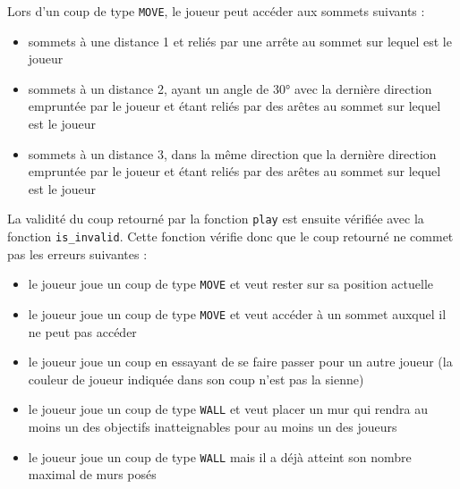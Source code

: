 Lors d'un coup de type \texttt{MOVE}, le joueur peut accéder aux sommets suivants :
\begin{itemize}
\item sommets à une distance 1 et reliés par une arrête au sommet sur lequel est le joueur
\item sommets à un distance 2, ayant un angle de 30° avec la dernière direction empruntée par le joueur et étant reliés par des arêtes au sommet sur lequel est le joueur
  \item sommets à un distance 3, dans la même direction que la dernière direction empruntée par le joueur et étant reliés par des arêtes au sommet sur lequel est le joueur
\end{itemize}

\bigskip

La validité du coup retourné par la fonction \texttt{play} est ensuite vérifiée avec la fonction \texttt{is\_invalid}.
Cette fonction vérifie donc que le coup retourné ne commet pas les erreurs suivantes :
\begin{itemize}
\item le joueur joue un coup de type \texttt{MOVE} et veut rester sur sa position actuelle
  \item le joueur joue un coup de type \texttt{MOVE} et veut accéder à un sommet auxquel il ne peut pas accéder
\item le joueur joue un coup en essayant de se faire passer pour un autre joueur (la couleur de joueur indiquée dans son coup n'est pas la sienne)
\item le joueur joue un coup de type \texttt{WALL} et veut placer un mur qui rendra au moins un des objectifs inatteignables pour au moins un des joueurs
  \item le joueur joue un coup de type \texttt{WALL} mais il a déjà atteint son nombre maximal de murs posés
  \end{itemize}








